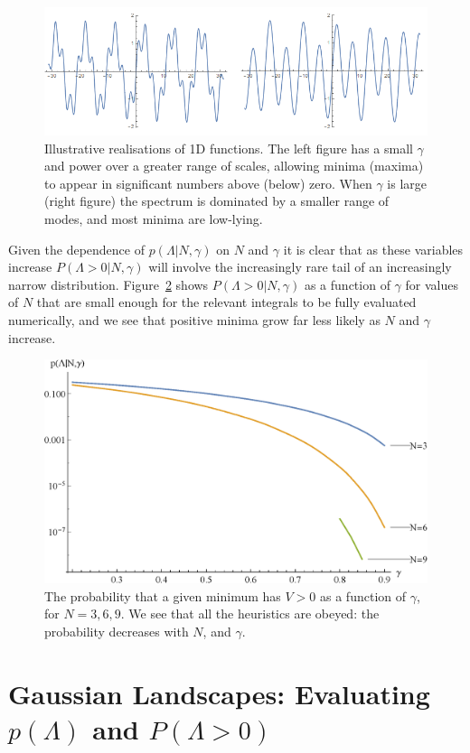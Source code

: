 \documentclass[12pt]{article}
\begin{document}
\begin{figure}
  \centering
    \includegraphics[width=\linewidth]{TwoSigmas.png}
  \caption{Illustrative realisations of 1D functions. The left figure has a small $\gamma$ and power over a greater range of scales, allowing minima (maxima) to appear in significant numbers above (below) zero. When $\gamma$ is large (right figure) the spectrum is dominated by a smaller range of modes, and most minima are low-lying.}
  \label{examples1}
\end{figure}

Given the dependence of $p(\Lambda|N,\gamma)$ on $N$ and $\gamma$ it is clear that as these variables increase $P(\Lambda>0|N,\gamma)$ will involve the increasingly rare tail of an increasingly narrow distribution. Figure~\ref{N6} shows $P(\Lambda>0|N,\gamma)$ as a function of $\gamma$ for values of $N$ that are small enough for the relevant integrals to be fully evaluated numerically, and we see that positive minima grow far less likely as $N$ and $\gamma$ increase. 

\begin{figure}
  \centering
  \includegraphics[width=.6 \linewidth]{N369.eps}
  \caption{The probability that a given minimum has $V > 0$ as a function of $\gamma$, for $N=3, 6, 9$. We see that all the heuristics are obeyed: the probability decreases with $N$, and  $\gamma$.}
  \label{N6}
  \end{figure}


\section{Gaussian Landscapes: Evaluating $p(\Lambda)$ and $P(\Lambda>0)$} \label{PeakNumbers}
\end{document}
